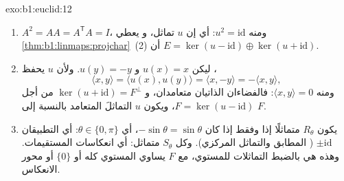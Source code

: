 \begin{solution}{exo:b1:euclid:12}
\begin{enumerate}
  \item $A^2 = A A = A^{\mathsf T} A = I$، ومنه $u^2 =
        \mathrm{id}$: أي إن $u$ تماثل، و
        يعطي \cref{thm:b1:linmaps:projchar}~(2) أن $E = \ker(u -
        \mathrm{id}) \oplus \ker(u + \mathrm{id})$.
  \item ليكن $u(x) = x$ و $u(y) = -y$. ولأن $u$ يحفظ
        ،
        \[
        \langle x, y\rangle = \langle u(x), u(y)\rangle
        = \langle x, -y\rangle = -\langle x, y\rangle ,
        \]
        ومنه $\langle x, y\rangle = 0$: فالفضاءان الذاتيان
        متعامدان، و $\ker(u + \mathrm{id}) = F^\perp$ من أجل $F =
        \ker(u - \mathrm{id})$، ويكون $u$ التماثلَ المتعامد
        بالنسبة إلى $F$.
  \item يكون $R_\theta$ متماثلًا إذا وفقط إذا كان $-\sin\theta = \sin\theta$،
        أي $\theta \in \{0, \pi\}$: أي التطبيقان $\pm\mathrm{id}$
        ( المطابق والتماثل المركزي). وكل $S_\theta$
        متماثل: أي انعكاسات المستقيمات. وهذه هي بالضبط
        التماثلات  للمستوي، مع $F$ يساوي
        المستوي كله أو $\{0\}$ أو محور الانعكاس.
\end{enumerate}
\end{solution}

